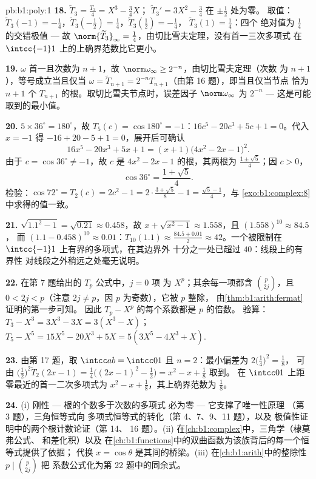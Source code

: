 \begin{solution}{pb:b1:poly:1}
\textbf{18.} $\widetilde T_3 = \frac{T_3}4 = X^3 - \frac34X$；
$\widetilde T_3{}' = 3X^2 - \frac34$ 在 $\pm\frac12$ 处为零。
取值：$\widetilde T_3(-1) = -\frac14$，$\widetilde
T_3(-\tfrac12) = \frac14$，$\widetilde T_3(\tfrac12) = -\frac14$，
$\widetilde T_3(1) = \frac14$：四个
绝对值为 $\frac14$ 的交错极值 --- 故 $\norm{\widetilde T_3}_\infty =
\frac14$，由切比雪夫定理，没有首一三次多项式
在 $\intcc{-1}1$ 上的上确界范数比它更小。

\textbf{19.} $\omega$ 首一且次数为 $n + 1$，故
$\norm\omega_\infty \geq 2^{-n}$，由切比雪夫定理（次数
为 $n+1$），等号成立当且仅当 $\omega = \widetilde T_{n+1}
= 2^{-n}T_{n+1}$（由第 16 题），即当且仅当节点
恰为 $n + 1$ 个 $T_{n+1}$ 的根。取切比雪夫节点时，误差因子
$\norm\omega_\infty$ 为 $2^{-n}$ --- 这是可能取到的最小值。

\textbf{20.} $5 \times 36^\circ = 180^\circ$，故 $T_5(c) =
\cos180^\circ = -1$：$16c^5 - 20c^3 + 5c + 1 = 0$。代入 $x =
-1$ 得 $-16 + 20 - 5 + 1 = 0$，展开后可确认
\[
16x^5 - 20x^3 + 5x + 1 = (x + 1)\bigl(4x^2 - 2x - 1\bigr)^2 .
\]
由于 $c = \cos36^\circ \neq -1$，故 $c$ 是 $4x^2 - 2x -
1$ 的根，其两根为 $\frac{1 \pm \sqrt5}4$；因 $c > 0$，
\[
\cos36^\circ = \frac{1 + \sqrt5}4 .
\]
检验：$\cos72^\circ = T_2(c) = 2c^2 - 1 = 2\cdot\frac{3 +
\sqrt5}8 - 1 = \frac{\sqrt5 - 1}4$，与
\cref{exo:b1:complex:8}中求得的值一致。

\textbf{21.} $\sqrt{1.1^2 - 1} = \sqrt{0.21} \approx 0.458$，故
$x + \sqrt{x^2-1} \approx 1.558$，且 $(1.558)^{10} \approx 84.5$，
而 $(1.1 - 0.458)^{10} \approx 0.01$：$T_{10}(1.1) \approx
\frac{84.5 + 0.01}2 \approx 42$。一个被限制在
$\intcc{-1}1$ 上有界的多项式，在其边界外
十分之一处已超过 $40$：线段上的有界性
对线段之外稍远之处毫无说明。

\textbf{22.} 在第 7 题给出的 $T_p$ 公式中，$j = 0$ 项
为 $X^p$；其余每一项都含 $\binom p{2j}$，且 $0 < 2j <
p$（注意 $2j \neq p$，因 $p$ 为奇数），它被 $p$ 整除，
由\cref{thm:b1:arith:fermat}证明的第一步可知。
因此 $T_p - X^p$ 的每个系数都是 $p$ 的倍数。
验算：$T_3 - X^3 = 3X^3 - 3X = 3(X^3 - X)$；$T_5 - X^5 = 15X^5
- 20X^3 + 5X = 5(3X^5 - 4X^3 + X)$.

\textbf{23.} 由第 17 题，取 $\intcc ab = \intcc01$ 且 $n =
2$：最小偏差为 $2\bigl(\frac14\bigr)^2 = \frac18$，
可由 $\bigl(\frac12\bigr)^2\widetilde T_2(2x - 1) =
\frac14\bigl((2x-1)^2 - \frac12\bigr) = x^2 - x + \frac18$ 取到。
在 $\intcc01$ 上距零最近的首一二次多项式为 $x^2 - x +
\frac18$，其上确界范数为 $\frac18$。

\textbf{24.} (i) 刚性 --- 根的个数多于次数的多项式
必为零 --- 它支撑了唯一性原理
（第 3 题），三角恒等式向
多项式恒等式的转化（第 4、7、9、11 题），以及
极值性证明中的两个根计数论证（第 14、
16 题）。(ii) 在\cref{ch:b1:complex}中，三角学（棣莫弗公式、
和差化积）以及
在\cref{ch:b1:functions}中的双曲函数为该族背后的每一个恒等式提供了依据；
代换 $x = \cos\theta$ 是其间的桥梁。(iii)
在\cref{ch:b1:arith}中的整除性 $p \mid \binom p{2j}$ 把
系数公式化为第 22 题中的同余式。


\end{solution}
